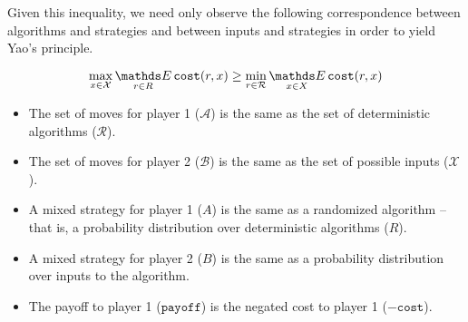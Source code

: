 Given this inequality, we need only observe the following correspondence between algorithms and strategies and between inputs and strategies in order to yield Yao's principle.

$$\max_{x \in \mathcal{X}} \Expected_{r \in R} \texttt{cost}(r, x) \geq \min_{r \in \mathcal{R}} \Expected_{x \in X} \texttt{cost}(r, x)$$

\begin{itemize}

\item{The set of moves for player 1 ($\mathcal{A}$) is the same as the set of deterministic algorithms ($\mathcal{R}$).}
\item{The set of moves for player 2 ($\mathcal{B}$) is the same as the set of possible inputs ($\mathcal{X}$).}
\item{A mixed strategy for player 1 ($A$) is the same as a randomized algorithm -- that is, a probability distribution over deterministic algorithms ($R$).}
\item{A mixed strategy for player 2 ($B$) is the same as a probability distribution over inputs to the algorithm.}
\item{The payoff to player 1 ($\texttt{payoff}$) is the negated cost to player 1 ($-\texttt{cost}$).}

\end{itemize}




